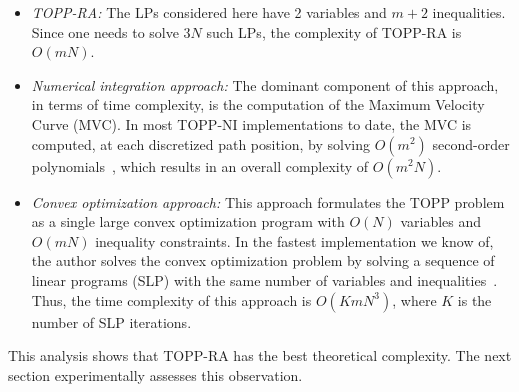 \documentclass[journal]{IEEEtran}
\theoremstyle{plain}
\theoremstyle{definition}
\theoremstyle{definition}
\begin{document}
\begin{itemize}
\item \emph{TOPP-RA:} The LPs considered here have 2 variables and
  $m+2$ inequalities. Since one needs to solve $3N$ such LPs, the
  complexity of TOPP-RA is $O(mN)$.

\item \emph{Numerical integration approach:} The dominant component of
  this approach, in terms of time complexity, is the computation of
  the Maximum Velocity Curve (MVC). In most TOPP-NI implementations to
  date, the MVC is computed, at each discretized path position, by
  solving $O(m^2)$ second-order
  polynomials~\cite{bobrow1985time,pfeiffer1987concept,
    slotine1989improving,shiller1992computation,pham2014general},
  which results in an overall complexity of $O(m^2N)$.

\item \emph{Convex optimization approach:} This approach formulates
  the TOPP problem as a single large convex optimization program with
  $O(N)$ variables and $O(mN)$ inequality constraints. In the fastest
  implementation we know of, the author solves the convex optimization
  problem by solving a sequence of linear programs (SLP) with the same
  number of variables and inequalities~\cite{hauser2014}. Thus, the
  time complexity of this approach is $O(KmN^3)$, where $K$ is the
  number of SLP iterations.
\end{itemize}

This analysis shows that TOPP-RA has the best theoretical
complexity. The next section experimentally assesses this observation.

\end{document}
